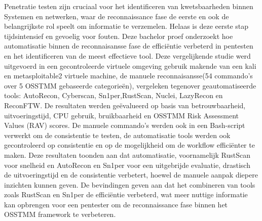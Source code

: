 Penetratie testen zijn cruciaal voor het identificeren van kwetsbaarheden binnen Systemen en netwerken, waar de reconnaissance fase de eerste en ook de belangrijkste rol speelt om informatie te verzemelen.
Helaas is deze eerste stap tijdsintensief en gevoelig voor fouten.
Deze bachelor proef onderzoekt hoe automatisatie binnen de reconnaisansse fase de efficiëntie verbeterd in pentesten en het identificeren van de meest effectieve tool.
Deze vergelijkende studie werd uitgevoerd in een gecontroleerde virtuele omgeving gebruik makende van een kali en metasploitable2 virtuele machine, de manuele reconnaisansse(54 commando's over 5 OSSTMM gebaseerde categorieën), vergeleken tegenover geautomatiseerde tools: AutoRecon, Cyberscan, Sn1per,RustScan, Nuclei, LazyRecon en ReconFTW.
De resultaten werden geëvalueerd op basis van betrouwbaarheid, uitvoeringstijd, CPU gebruik, bruikbaarheid en OSSTMM Risk Assessment Values (RAV) scores.
De manuele commando's werden ook in een Bash-script verwerkt om de consistentie te testen, de automatisatie tools werden ook gecontroleerd op consistentie en op de mogelijkheid om de workflow efficiënter te maken.
Deze resultaten toonden aan dat automatisatie, voornamelijk RustScan voor snelheid en AutoRecon en Sn1per voor een uitgebrijde evaluatie, drastisch de uitvoeringstijd en de consistentie verbetert, hoewel de manuele aanpak diepere inzichten kunnen geven.
De bevindingen geven aan dat het combineren van tools zoals RustScan en Sn1per de efficiëntie verbeterd, wat meer nuttige informatie kan opbrengen voor een pentester om de reconnaissance fase binnen het OSSTMM framework te verbeteren.
